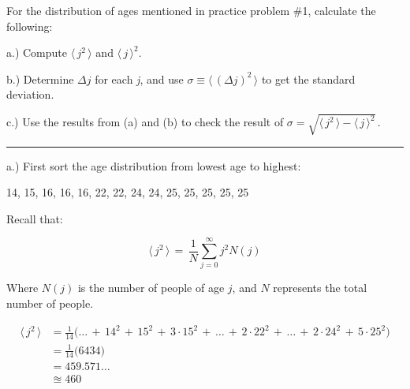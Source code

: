 For the distribution of ages mentioned in practice problem \#1, calculate the following:

a.) Compute $\langle \, j^{2} \, \rangle$ and $\langle \, j \, \rangle^{2}$.

b.) Determine $\Delta j$ for each \textit{j}, and use $\sigma \equiv \langle \, ( \Delta j )^{2} \, \rangle$ to
get the standard deviation.

c.) Use the results from (a) and (b) to check the result of
$\sigma = \sqrt{ \langle \, j^{2} \, \rangle - \langle \, j \, \rangle^{2} }\,$.

\bigskip
\hrule height 0.75pt
\bigskip

a.) First sort the age distribution from lowest age to highest:

14, 15, 16, 16, 16, 22, 22, 24, 24, 25, 25, 25, 25, 25

\smallskip

Recall that:

\[
  \langle \, j^{2}  \, \rangle \, = \, \frac{1}{N} \sum_{j=0}^{\infty} j^{2} N(j)
\]

Where $N(j)$ is the number of people of age $j$, and $N$ represents the total number of people.

\begin{align*}
  \langle \, j^{2} \, \rangle &=
  \frac{1}{14}
  \big(\dots \, + \, 14^{2} \, + \, 15^{2} \, + \, 3 \cdot 15^{2} \, + \, \dots \, + \, 2 \cdot 22^{2} \, +
  \, \dots \, + \, 2 \cdot 24^{2} \, + \, 5 \cdot 25^{2} \big) \\[2ex]
  &= \frac{1}{14} \big(6434\big) \\[2ex]
  &= 459.571\dots \\[2ex]
  &\approxeq 460
\end{align*}